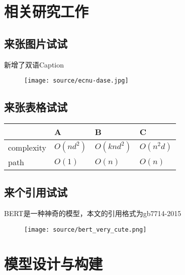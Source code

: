\documentclass{ecnuthesis}
\begin{document}
\chapter{相关研究工作}

\section{来张图片试试}


新增了双语Caption

\begin{figure}[H]
    \centering
    \texttt{[image: source/ecnu-dase.jpg]}
\end{figure}


\section{来张表格试试}

\begin{table}[h]
\centering
\begin{tabular}{llll} 
  & A & B & C \\
  \hline complexity & $O(nd^{2})$ & $O({knd^{2}})$ & $O(n^{2}d)$ \\
  \hline path & $O(1)$ & $O(n)$ & $O(n)$ \\
\end{tabular}

  \label{tab:my_label}
\end{table}

\section{来个引用试试}

BERT\cite{devlin-etal-2019-bert}是一种神奇的模型，本文的引用格式为gb7714-2015

\begin{figure}[H]
    \centering
    \texttt{[image: source/bert\_very\_cute.png]}
\end{figure}

\chapter{模型设计与构建}
\end{document}

